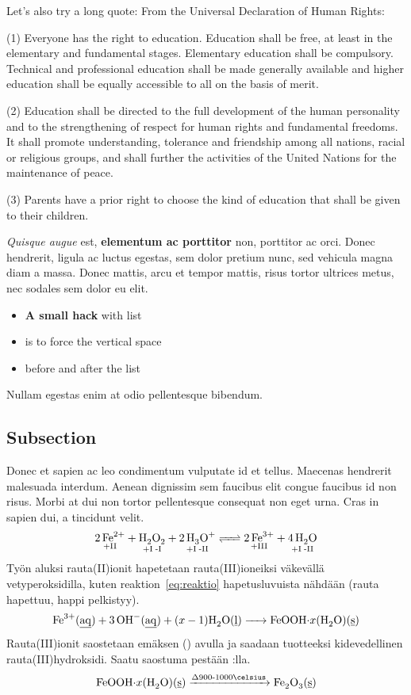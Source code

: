 \documentclass[11pt,a4paper,oneside,article]{memoir}
\newcommand\reaction[1]{\begin{equation}\ce{#1}\end{equation}} %
\renewenvironment{quote}
  {\list{}{\rightmargin=0pt\leftmargin=1cm\topsep=-10pt}%
  \item\relax\fontsize{10pt}{10pt}\singlespacing}
  {\endlist}
\begin{document}
Let's also try a long quote:
From the Universal Declaration of Human Rights:
\begin{quote}
(1) Everyone has the right to education. Education shall be free, at least in the elementary and fundamental stages. Elementary education shall be compulsory. Technical and professional education shall be made generally available and higher education shall be equally accessible to all on the basis of merit.

(2) Education shall be directed to the full development of the human personality and to the strengthening of respect for human rights and fundamental freedoms. It shall promote understanding, tolerance and friendship among all nations, racial or religious groups, and shall further the activities of the United Nations for the maintenance of peace.

(3) Parents have a prior right to choose the kind of education that shall be given to their children. \cite[article 26]{un:udhr}
\end{quote}

\textit{Quisque augue} est, \textbf{elementum ac porttitor} non, porttitor ac orci. Donec hendrerit, ligula ac luctus egestas, sem dolor pretium nunc, sed vehicula magna diam a massa. Donec mattis, arcu et tempor mattis, risus tortor ultrices metus, nec sodales sem dolor eu elit.\vspace{-17pt} 
\begin{itemize}
\item \textbf{A small hack} with list
\item is to force the vertical space 
\item before and after the list
\end{itemize}
\vspace{-17pt} Nullam egestas enim at odio pellentesque bibendum. 

\subsection{Subsection}
Donec et sapien ac leo condimentum vulputate id et tellus. Maecenas hendrerit malesuada interdum. Aenean dignissim sem faucibus elit congue faucibus id non risus. Morbi at dui non tortor pellentesque consequat non eget urna. Cras in sapien dui, a tincidunt velit.
\reaction{\label{eq:reaktio}$\underset{\text{+II}}{\ce{2Fe^2+}}$ + $\underset{\text{+I\;-I}}{\ce{H2O2}}$ + $\underset{\text{+I\;-II}}{\ce{2H3O^+}}$ <=> $\underset{\text{+III}}{\ce{2Fe^3+}}$ + $\underset{\text{+I\;-II}}{\ce{4H2O}}$}
Työn aluksi rauta(II)ionit hapetetaan rauta(III)ioneiksi väkevällä vetyperoksidilla, kuten reaktion~\ref{eq:reaktio} hapetusluvuista nähdään (rauta hapettuu, happi pelkistyy).  
\reaction{Fe^3+( \emph{aq} ) + 3OH^-( \emph{aq} ) + $(x-1)$H2O( \emph{l} ) -> FeOOH $\cdot$ $x$(H2O)( \emph{s} )}
Rauta(III)ionit saostetaan emäksen () avulla ja saadaan tuotteeksi kidevedellinen rauta(III)hydroksidi. Saatu saostuma pestään :lla.
\reaction{FeOOH $\cdot$ $x$(H2O)( \emph{s} ) ->T[$\Delta$900-1000\celsius] Fe2O3( \emph{s} )}
\end{document}
